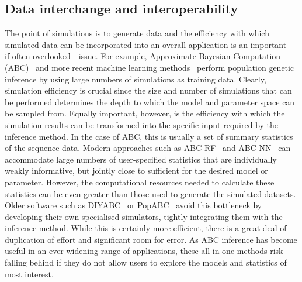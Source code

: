 \documentclass{article}
\begin{document}
\subsection*{Data interchange and interoperability}
The point of simulations is to generate data and the efficiency with
which simulated data can be incorporated into an overall application
is an important---if often overlooked---issue.
For example, Approximate Bayesian Computation
(ABC)~\citep{beaumont2002approximate,csillery2010approximate,wegmann2010abctoolbox}
and more recent machine learning
methods~\citep{sheehan2016deep,schrider2018supervised,flagel2019unreasonable}
perform population genetic inference by using large numbers of
simulations as training data. Clearly, simulation efficiency is
crucial since the size and number of simulations that can be performed determines
the depth to which the model and parameter space can be sampled from.
Equally important,
however, is the efficiency with which the simulation results can be
transformed into the specific input required by the inference method.
In the case of ABC, this is usually a set of summary statistics of the sequence data.
Modern approaches such as
ABC-RF~\citep{raynal2019abc,pudlo2016abc} and
ABC-NN~\citep{csillery2012abc,blum2010abc} can accommodate large numbers of user-specified statistics that are individually weakly informative,
but jointly close to sufficient for the desired model or parameter.
However, the computational resources needed to calculate these statistics can be even
greater than those used to generate the simulated datasets.
Older software such as DIYABC~\citep{cornuet2008inferring}
or PopABC~\citep{lopes2009popabc} avoid this bottleneck by
developing their own specialised simulators, tightly integrating them
with the inference method. While this is certainly more efficient,
there is a great deal of duplication of effort and significant
room for error.
As ABC inference has become useful in an ever-widening range of applications,
these all-in-one methods risk falling behind if they do not allow users to explore
the models and statistics of most interest.
\end{document}
